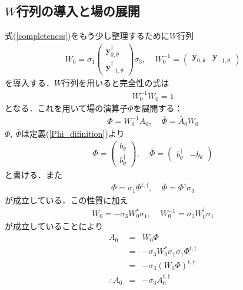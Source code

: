 \documentclass[10.5pt,a4paper]{jreport}
\begin{document}
\subsection{$W$行列の導入と場の展開}
式(\ref{completeness})をもう少し整理するために$W$行列
\begin{eqnarray}
  W_0=\sigma_1
  \begin{pmatrix}
    \bm{y}^\dagger_{0,\theta}  \\
    \bm{y}^\dagger_{-1,\theta}
  \end{pmatrix}\sigma_3,\ \ \ \ \ 
  W^{-1}_0 = 
  \begin{pmatrix}
    \bm{y}_{0,\theta} & \bm{y}_{-1,\theta}
  \end{pmatrix}\label{W_difinition}
\end{eqnarray}
を導入する．$W$行列を用いると完全性の式は
\begin{eqnarray}
  W^{-1}_0 W_0=1
\end{eqnarray}
となる．これを用いて場の演算子$\Phi$を展開する：
\begin{eqnarray}
  \Phi = W^{-1}_0A_0,\ \ \ \ \ \bar\Phi =\bar A_0W_0\label{Phi_expansion}
\end{eqnarray}
$\Phi,\ \bar\Phi$は定義(\ref{Phi_difinition})より
\begin{eqnarray}
  \Phi = 
  \begin{pmatrix}
    b_\theta \\
    b^\dagger_\theta 
  \end{pmatrix},\ \ \ \ \ 
  \bar\Phi = 
  \begin{pmatrix}
    b^\dagger_\theta & -b_\theta
  \end{pmatrix}
\end{eqnarray}
と書ける．また
\begin{eqnarray}
  \Phi = \sigma_1\Phi^{t,\dagger},\ \ \ \ \ 
  \bar\Phi = \Phi^\dagger\sigma_3
\end{eqnarray}
が成立している．この性質に加え
\begin{eqnarray}
  W_0 = -\sigma_3 W^*_0\sigma_1,\ \ \ \ \ W^{-1}_0 = \sigma_3 W^\dagger_0\sigma_1
\end{eqnarray}
が成立していることにより
\begin{eqnarray}
  A_0 &=& W_0\Phi\\
  &=& -\sigma_3 W^*_0\sigma_1\sigma_1\Phi^{t,\dagger}\\
  &=& -\sigma_3 (W_0\Phi)^{t,\dagger}\\
  \therefore A_0 &=& -\sigma_3 A^{t,\dagger}_0\label{A1}
\end{eqnarray}
\end{document}
